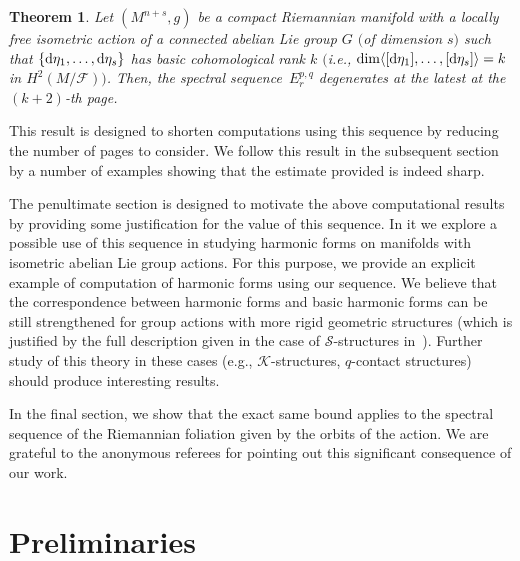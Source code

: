\documentclass[10pt,a4paper]{amsart}
\numberwithin{equation}{section}
\newtheorem{tw}{Theorem}[section]
\theoremstyle{definition}
\begin{document}
\begin{tw}\label{Main} Let $(M^{n+s},g)$ be a compact Riemannian manifold with a locally free isometric action of a connected abelian Lie group $G$ $($of dimension $s)$ such that $\{{\rm d}\eta_1,\dots,{\rm d}\eta_s\}$ has basic cohomological rank $k$ $\bigl($i.e., $\dim \langle [{\rm d}\eta_1], \dots, [{\rm d}\eta_s] \rangle = k$ in $H^2(M\slash\mathcal{F})\bigr)$. Then, the spectral sequence~$E^{p,q}_r$ degenerates at the latest at the $(k+2)$-th page.
\end{tw}
 This result is designed to shorten computations using this sequence by reducing the number of pages to consider. We follow this result in the subsequent section by a number of examples showing that the estimate provided is indeed sharp.

 The penultimate section is designed to motivate the above computational results by providing some justification for the value of this sequence. In it we explore a possible use of this sequence in studying harmonic forms on manifolds with isometric abelian Lie group actions. For this purpose, we provide an explicit example of computation of harmonic forms using our sequence. We believe that the correspondence between harmonic forms and basic harmonic forms can be still strengthened for group actions with more rigid geometric structures (which is justified by the full description given in the case of $\mathcal{S}$-structures in~\cite{My3}). Further study of this theory in these cases (e.g., $\mathcal{K}$-structures, $q$-contact structures) should produce interesting results.

In the final section, we show that the exact same bound applies to the spectral sequence of the Riemannian foliation given by the orbits of the action. We are grateful to the anonymous referees for pointing out this significant consequence of our work.

\section{Preliminaries}
\end{document}
